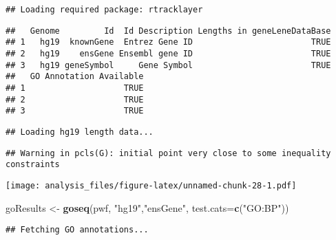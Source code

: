 \documentclass[]{article}
\newenvironment{Shaded}{\begin{snugshade}}{\end{snugshade}}
\newcommand{\DataTypeTok}[1]{\textcolor[rgb]{0.13,0.29,0.53}{#1}}
\newcommand{\KeywordTok}[1]{\textcolor[rgb]{0.13,0.29,0.53}{\textbf{#1}}}
\newcommand{\NormalTok}[1]{#1}
\newcommand{\OperatorTok}[1]{\textcolor[rgb]{0.81,0.36,0.00}{\textbf{#1}}}
\newcommand{\StringTok}[1]{\textcolor[rgb]{0.31,0.60,0.02}{#1}}
\begin{document}
\begin{verbatim}
## Loading required package: rtracklayer
\end{verbatim}

\begin{verbatim}
##   Genome         Id  Id Description Lengths in geneLeneDataBase
## 1   hg19  knownGene  Entrez Gene ID                        TRUE
## 2   hg19    ensGene Ensembl gene ID                        TRUE
## 3   hg19 geneSymbol     Gene Symbol                        TRUE
##   GO Annotation Available
## 1                    TRUE
## 2                    TRUE
## 3                    TRUE
\end{verbatim}

\begin{Shaded}
\end{Shaded}

\begin{verbatim}
## Loading hg19 length data...
\end{verbatim}

\begin{verbatim}
## Warning in pcls(G): initial point very close to some inequality constraints
\end{verbatim}

\texttt{[image: analysis\_files/figure-latex/unnamed-chunk-28-1.pdf]}

\begin{Shaded}
\begin{Highlighting}[]
\NormalTok{goResults <-}\StringTok{ }\KeywordTok{goseq}\NormalTok{(pwf, }\StringTok{"hg19"}\NormalTok{,}\StringTok{"ensGene"}\NormalTok{, }\DataTypeTok{test.cats=}\KeywordTok{c}\NormalTok{(}\StringTok{"GO:BP"}\NormalTok{))}
\end{Highlighting}
\end{Shaded}

\begin{verbatim}
## Fetching GO annotations...
\end{verbatim}
\end{document}
